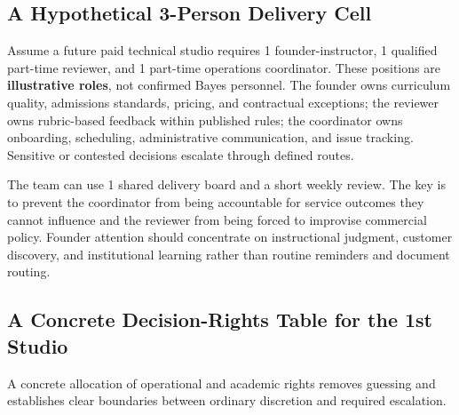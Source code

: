 \subsection{A Hypothetical 3-Person Delivery Cell}
\label{sec:bayes_three_person_cell}

Assume a future paid technical studio requires 1 founder-instructor, 1 qualified part-time reviewer, and 1 part-time operations coordinator. These positions are \textbf{illustrative roles}, not confirmed Bayes personnel. The founder owns curriculum quality, admissions standards, pricing, and contractual exceptions; the reviewer owns rubric-based feedback within published rules; the coordinator owns onboarding, scheduling, administrative communication, and issue tracking. Sensitive or contested decisions escalate through defined routes.

The team can use 1 shared delivery board and a short weekly review. The key is to prevent the coordinator from being accountable for service outcomes they cannot influence and the reviewer from being forced to improvise commercial policy. Founder attention should concentrate on instructional judgment, customer discovery, and institutional learning rather than routine reminders and document routing.

\subsection{A Concrete Decision-Rights Table for the 1st Studio}
\label{sec:bayes_decision_rights_table}

A concrete allocation of operational and academic rights removes guessing and establishes clear boundaries between ordinary discretion and required escalation.

